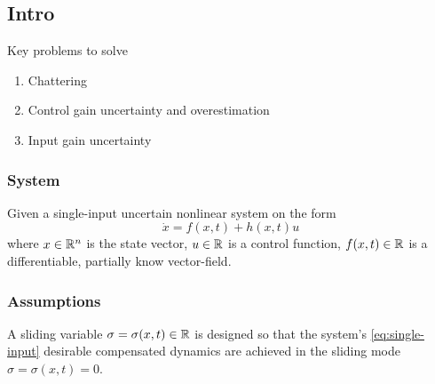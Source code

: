 
\subsection{Intro}
Key problems to solve
\begin{enumerate}
\item Chattering
\item Control gain uncertainty and overestimation
\item Input gain uncertainty 
\end{enumerate}


\subsubsection{System}
Given a single-input uncertain nonlinear system on the form
\begin{equation}
    \dot{x} = f(x,t) + h(x,t)u
    \label{eq:single-input}
\end{equation}
where $x \in \mathbb{R}^n$ is the state vector, $u \in \mathbb{R}$ is a control function, $f(x,t) \in \mathbb{R}$ is a differentiable, partially know vector-field.

\subsubsection{Assumptions}
\begin{assumption}
A sliding variable $\sigma = \sigma(x,t) \in \mathbb{R}$ is designed so that the system's \eqref{eq:single-input} desirable compensated dynamics are achieved in the sliding mode $\sigma = \sigma(x,t) = 0$.
\end{assumption}


